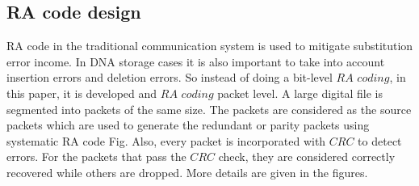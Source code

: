 \documentclass[10pt,twocolumn,twoside]{gsajnl}
\begin{document}
\subsection{RA code design}
RA code in the traditional communication system is used to mitigate substitution error income.
In DNA storage cases it is also important to take into account insertion errors and deletion errors. So instead of doing a bit-level $RA$ $coding$, in this paper, it is developed and $RA$ $coding$ packet level.
A large digital file is segmented into packets of the same size. The packets are considered as the source packets which are used to generate the redundant or parity packets using systematic RA code Fig. Also, every packet is incorporated with $CRC$ to detect errors. For 
the packets that pass the $CRC$ check, they are considered correctly recovered while others are dropped. More details are given in the figures.
\end{document}
